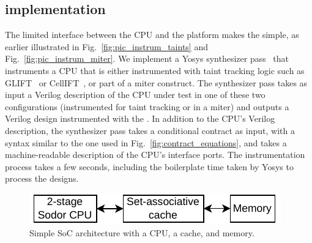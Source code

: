 \subsection{\PICI implementation}
\label{subsec:pici_impl}

The limited interface between the CPU and the platform makes the \PICIs simple, as earlier illustrated in Fig.~\ref{fig:pic_instrum_taints} and Fig.~\ref{fig:pic_instrum_miter}.
We implement a Yosys synthesizer pass~\cite{wolf2013yosys} that instruments a CPU that is either instrumented with taint tracking logic such as GLIFT~\cite{tiwari2009complete} or CellIFT~\cite{solt2022cellift}, or part of a miter construct.
The synthesizer pass takes as input a Verilog description of the CPU under test in one of these two configurations (instrumented for taint tracking or in a miter) and outputs a Verilog design instrumented with the \PICI.
In addition to the CPU's Verilog description, the synthesizer pass takes a conditional contract as input, with a syntax similar to the one used in Fig.~\ref{fig:contract_equations}, and takes a machine-readable description of the CPU's interface ports.
The instrumentation process takes a few seconds, including the boilerplate time taken by Yosys to process the designs.

\begin{figure}[t]
    \begin{center}
    \includegraphics[width=0.80\columnwidth]{figures/simple_soc/simple_soc.pdf}
    \end{center}
    \vspace*{-1.2em}
    \caption{\label{fig:simple_soc} Simple SoC architecture with a CPU, a cache, and memory.}
    \vspace*{-1.4em}
\end{figure}

